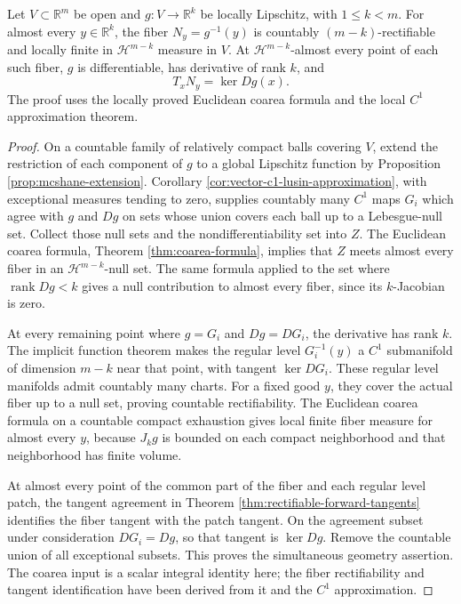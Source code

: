 \begin{theorem}\label{thm:euclidean-lipschitz-fiber-geometry}
Let $V\subset\mathbb R^m$ be open and $g:V\to\mathbb R^k$ be locally Lipschitz, with $1\leq k<m$. For almost every $y\in\mathbb R^k$, the fiber $N_y=g^{-1}(y)$ is countably $(m-k)$-rectifiable and locally finite in $\mathcal H^{m-k}$ measure in $V$. At $\mathcal H^{m-k}$-almost every point of each such fiber, $g$ is differentiable, has derivative of rank $k$, and
\[
 T_xN_y=\ker Dg(x).
\]
The proof uses the locally proved Euclidean coarea formula and the local $C^1$ approximation theorem.
\end{theorem}
\begin{proof}
On a countable family of relatively compact balls covering $V$, extend the restriction of each component of $g$ to a global Lipschitz function by Proposition \ref{prop:mcshane-extension}. Corollary \ref{cor:vector-c1-lusin-approximation}, with exceptional measures tending to zero, supplies countably many $C^1$ maps $G_i$ which agree with $g$ and $Dg$ on sets whose union covers each ball up to a Lebesgue-null set. Collect those null sets and the nondifferentiability set into $Z$. The Euclidean coarea formula, Theorem \ref{thm:coarea-formula}, implies that $Z$ meets almost every fiber in an $\mathcal H^{m-k}$-null set. The same formula applied to the set where $\operatorname{rank}Dg<k$ gives a null contribution to almost every fiber, since its $k$-Jacobian is zero.

At every remaining point where $g=G_i$ and $Dg=DG_i$, the derivative has rank $k$. The implicit function theorem makes the regular level $G_i^{-1}(y)$ a $C^1$ submanifold of dimension $m-k$ near that point, with tangent $\ker DG_i$. These regular level manifolds admit countably many charts. For a fixed good $y$, they cover the actual fiber up to a null set, proving countable rectifiability. The Euclidean coarea formula on a countable compact exhaustion gives local finite fiber measure for almost every $y$, because $J_kg$ is bounded on each compact neighborhood and that neighborhood has finite volume.

At almost every point of the common part of the fiber and each regular level patch, the tangent agreement in Theorem \ref{thm:rectifiable-forward-tangents} identifies the fiber tangent with the patch tangent. On the agreement subset under consideration $DG_i=Dg$, so that tangent is $\ker Dg$. Remove the countable union of all exceptional subsets. This proves the simultaneous geometry assertion. The coarea input is a scalar integral identity here; the fiber rectifiability and tangent identification have been derived from it and the $C^1$ approximation.
\end{proof}


